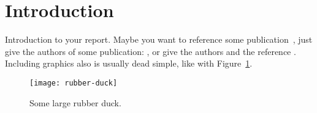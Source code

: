 \section{Introduction} \label{introduction}

Introduction to your report. Maybe you want to reference some publication~\cite{Bergsma:2007}, just give the authors of some publication: \citeauthor{Bergsma:2007}, or give the authors and the reference \citet{Bergsma:2007}. Including graphics also is usually dead simple, like with Figure~\ref{rubber-duck}.
\citet{Risvik:2003}

\begin{figure}[b]
    \centering
    \texttt{[image: rubber-duck]}
    \caption{Some large rubber duck.}
    \label{rubber-duck}
\end{figure}

